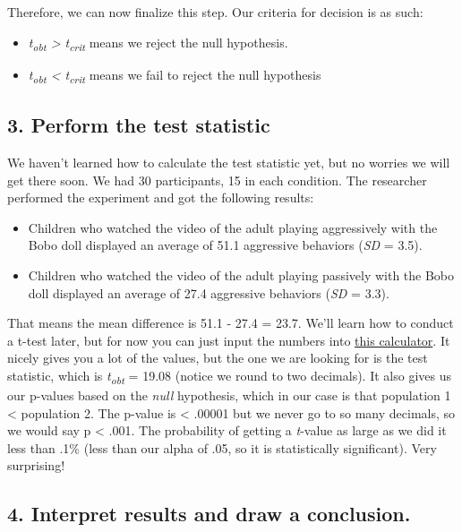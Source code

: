 \documentclass[
]{book}
\begin{document}
Therefore, we can now finalize this step. Our criteria for decision is as such:

\begin{itemize}
\item
  \emph{t\textsubscript{obt} \textgreater{} t\textsubscript{crit}} means we reject the null hypothesis.
\item
  \emph{t\textsubscript{obt} \textless{} t\textsubscript{crit}} means we fail to reject the null hypothesis
\end{itemize}

\hypertarget{perform-the-test-statistic}{%
\subsection{3. Perform the test statistic}\label{perform-the-test-statistic}}

We haven't learned how to calculate the test statistic yet, but no worries we will get there soon. We had 30 participants, 15 in each condition. The researcher performed the experiment and got the following results:

\begin{itemize}
\item
  Children who watched the video of the adult playing aggressively with the Bobo doll displayed an average of 51.1 aggressive behaviors (\emph{SD} = 3.5).
\item
  Children who watched the video of the adult playing passively with the Bobo doll displayed an average of 27.4 aggressive behaviors (\emph{SD} = 3.3).
\end{itemize}

That means the mean difference is 51.1 - 27.4 = 23.7. We'll learn how to conduct a t-test later, but for now you can just input the numbers into \href{https://www.usablestats.com/calcs/2samplet\&summary=1}{this calculator}. It nicely gives you a lot of the values, but the one we are looking for is the test statistic, which is \emph{t\textsubscript{obt}} = 19.08 (notice we round to two decimals). It also gives us our p-values based on the \emph{null} hypothesis, which in our case is that population 1 \textless{} population 2. The p-value is \textless{} .00001 but we never go to so many decimals, so we would say p \textless{} .001. The probability of getting a \emph{t}-value as large as we did it less than .1\% (less than our alpha of .05, so it is statistically significant). Very surprising!

\hypertarget{interpret-results-and-draw-a-conclusion.}{%
\subsection{4. Interpret results and draw a conclusion.}\label{interpret-results-and-draw-a-conclusion.}}
\end{document}
